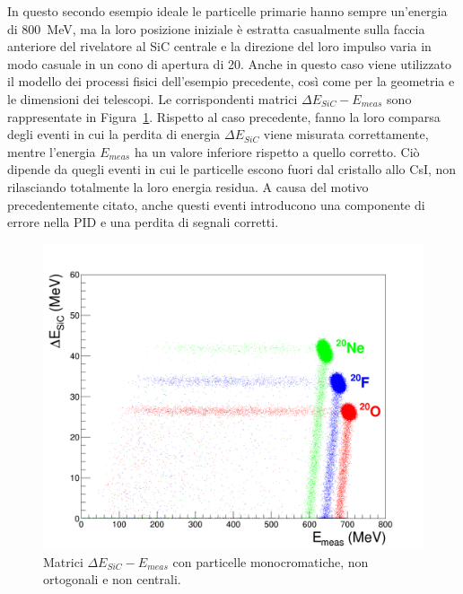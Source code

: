 In questo secondo esempio ideale le particelle primarie hanno sempre un'energia di 800~MeV, ma la loro posizione iniziale è estratta casualmente sulla faccia anteriore del rivelatore al SiC centrale e la direzione del loro impulso varia in modo casuale in un cono di apertura di 20\textdegree{}.
Anche in questo caso viene utilizzato il modello dei processi fisici dell'esempio precedente, così come per la geometria e le dimensioni dei telescopi.
Le corrispondenti matrici $\Delta E_{SiC} - E_{meas}$ sono rappresentate in Figura~\ref{fig:deltaE_ETot_full_energy}.
Rispetto al caso precedente, fanno la loro comparsa degli eventi in cui la perdita di energia $\Delta E_{SiC}$ viene misurata correttamente, mentre l'energia $E_{meas}$ ha un valore inferiore rispetto a quello corretto. 
Ciò dipende da quegli eventi in cui le particelle escono fuori dal cristallo allo CsI, non rilasciando totalmente la loro energia residua.
A causa del motivo precedentemente citato, anche questi eventi introducono una componente di errore nella PID e una perdita di segnali corretti.
\begin{figure} [!p]
	\centering
	\includegraphics[width=\textwidth, keepaspectratio]{Grafici_Tesi2/Particelle_non_ortogonali/deltaE_ETot_intero_range_quadrata.png}
	\caption{Matrici $\Delta E_{SiC} - E_{meas}$ con particelle monocromatiche, non ortogonali e non centrali.} \label{fig:deltaE_ETot_full_energy}
\end{figure}
